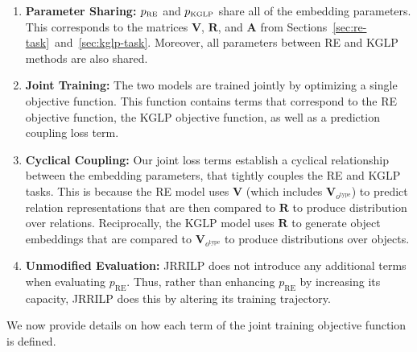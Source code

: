 \begin{enumerate}[noitemsep,topsep=0pt,leftmargin=2em]
    \item \textbf{Parameter Sharing:}
        $p_{\textrm{\tiny RE}}$ and $p_{\textrm{\tiny KGLP}}$ share all of the embedding parameters.
        This corresponds to the matrices $\bm{V}$, $\bm{R}$, and $\bm{A}$ from Sections~\ref{sec:re-task}~and~\ref{sec:kglp-task}. Moreover, all parameters between RE and KGLP methods are also shared.
    \item \textbf{Joint Training:}
        The two models are trained jointly by optimizing a single objective function.
        This function contains terms that correspond to the RE objective function, the KGLP objective function, as well as a prediction coupling loss term.
    \item \textbf{Cyclical Coupling:}
        Our joint loss terms establish a cyclical relationship between the embedding parameters, that tightly couples the RE and KGLP tasks.
        This is because the RE model uses $\bm{V}$ (which includes $\bm{V}_{o^{\textrm{type}}}$) to predict relation representations that are then compared to $\bm{R}$ to produce distribution over relations. Reciprocally, the KGLP model uses $\bm{R}$ to generate object embeddings that are compared to $\bm{V}_{o^{\textrm{type}}}$ to produce distributions over objects.
    \item \textbf{Unmodified Evaluation:} JRRILP does not introduce any additional terms when evaluating $p_{\textrm{RE}}$. Thus, rather than enhancing $p_{\textrm{RE}}$ by increasing its capacity, JRRILP does this by altering its training trajectory.
\end{enumerate}
We now provide details on how each term of the joint training objective function is defined.

